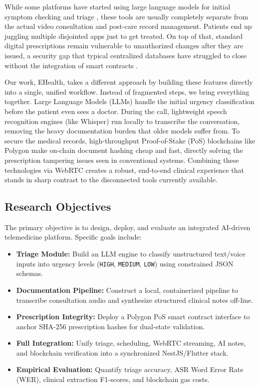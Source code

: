 \noindent While some platforms have started using large language models for initial symptom checking and triage \cite{triage_llm_2024, inclusive_healthcare_2025}, these tools are usually completely separate from the actual video consultation and post-care record management. Patients end up juggling multiple disjointed apps just to get treated. On top of that, standard digital prescriptions remain vulnerable to unauthorized changes after they are issued, a security gap that typical centralized databases have struggled to close without the integration of smart contracts \cite{medical_blockchain_ehr_2022, blockchain_healthcare_2020}.

\noindent Our work, EHealth, takes a different approach by building these features directly into a single, unified workflow. Instead of fragmented steps, we bring everything together. Large Language Models (LLMs) handle the initial urgency classification before the patient even sees a doctor. During the call, lightweight speech recognition engines (like Whisper) run locally to transcribe the conversation, removing the heavy documentation burden that older models suffer from. To secure the medical records, high-throughput Proof-of-Stake (PoS) blockchains like Polygon make on-chain document hashing cheap and fast, directly solving the prescription tampering issues seen in conventional systems. Combining these technologies via WebRTC creates a robust, end-to-end clinical experience that stands in sharp contrast to the disconnected tools currently available.

\subsection{Research Objectives}
The primary objective is to design, deploy, and evaluate an integrated AI-driven telemedicine platform. Specific goals include:
\begin{itemize}
    \setlength{\itemsep}{1pt}
    \setlength{\parskip}{0pt}
    \item \textbf{Triage Module:} Build an LLM engine to classify unstructured text/voice inputs into urgency levels (\texttt{HIGH}, \texttt{MEDIUM}, \texttt{LOW}) using constrained JSON schemas.
    \item \textbf{Documentation Pipeline:} Construct a local, containerized pipeline to transcribe consultation audio and synthesize structured clinical notes off-line.
    \item \textbf{Prescription Integrity:} Deploy a Polygon PoS smart contract interface to anchor SHA-256 prescription hashes for dual-state validation.
    \item \textbf{Full Integration:} Unify triage, scheduling, WebRTC streaming, AI notes, and blockchain verification into a synchronized NestJS/Flutter stack.
    \item \textbf{Empirical Evaluation:} Quantify triage accuracy, ASR Word Error Rate (WER), clinical extraction F1-scores, and blockchain gas costs.
\end{itemize}

